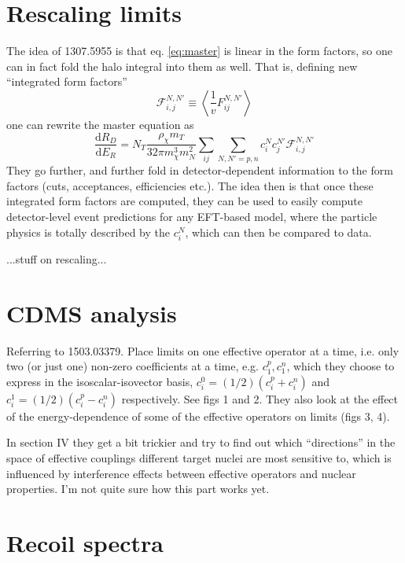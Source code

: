 \documentclass[a4paper]{article}	%
\begin{document}
\section{Rescaling limits}

The idea of 1307.5955\cite{Cirelli2013} is that eq. \ref{eq:master} is linear in the form factors, so one can in fact fold the halo integral into them as well. That is, defining new ``integrated form factors''
%
\begin{equation}
  \mathscr{F}_{i,j}^{N,N'} \equiv \left\langle \frac{1}{v} F_{ij}^{N,N'} \right\rangle
\end{equation}
%
one can rewrite the master equation as
%
\begin{equation}
 \frac{\mathrm{d}R_D}{\mathrm{d}E_R} = N_T\frac{\rho_\chi m_T}{32\pi m_\chi^3 m_N^2} \sum_{ij}\sum_{N,N'=p,n} c_i^N c_j^{N'} \mathscr{F}_{i,j}^{N,N'} 
 \label{eq:master}
\end{equation}
%
They go further, and further fold in detector-dependent information to the form factors (cuts, acceptances, efficiencies etc.). The idea then is that once these integrated form factors are computed, they can be used to easily compute detector-level event predictions for any EFT-based model, where the particle physics is totally described by the $c_i^N$, which can then be compared to data.

...stuff on rescaling...

\section{CDMS analysis}

Referring to 1503.03379\cite{Schneck2015}. Place limits on one effective operator at a time, i.e. only two (or just one) non-zero coefficients at a time, e.g. $c_1^p,c_1^n$, which they choose to express in the isoscalar-isovector basis, $c_i^0 = (1/2)\left(c_i^p + c_i^n \right)$ and $c_i^1 = (1/2)\left(c_i^p - c_i^n \right)$ respectively. See figs 1 and 2. They also look at the effect of the energy-dependence of some of the effective operators on limits (figs 3, 4).

In section IV they get a bit trickier and try to find out which ``directions'' in the space of effective couplings different target nuclei are most sensitive to, which is influenced by interference effects between effective operators and nuclear properties. I'm not quite sure how this part works yet.


\section{Recoil spectra}
\end{document}
